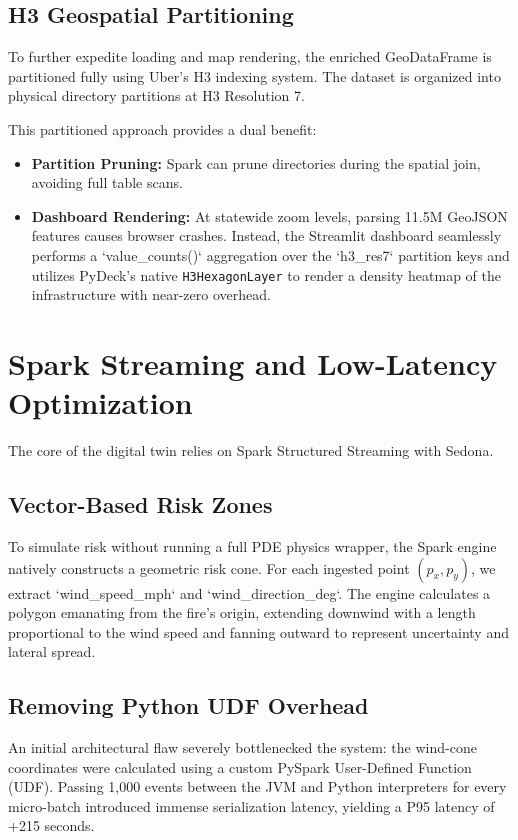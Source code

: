 \documentclass[acmsmall,screen,nonacm]{acmart}
\begin{document}
\subsection{H3 Geospatial Partitioning}
To further expedite loading and map rendering, the enriched GeoDataFrame is partitioned fully using Uber's H3 indexing system. The dataset is organized into physical directory partitions at H3 Resolution 7.

This partitioned approach provides a dual benefit:
\begin{itemize}
    \item \textbf{Partition Pruning:} Spark can prune directories during the spatial join, avoiding full table scans.
    \item \textbf{Dashboard Rendering:} At statewide zoom levels, parsing 11.5M GeoJSON features causes browser crashes. Instead, the Streamlit dashboard seamlessly performs a `value\_counts()` aggregation over the `h3\_res7` partition keys and utilizes PyDeck's native \texttt{H3HexagonLayer} to render a density heatmap of the infrastructure with near-zero overhead.
\end{itemize}

\section{Spark Streaming and Low-Latency Optimization}
The core of the digital twin relies on Spark Structured Streaming with Sedona.

\subsection{Vector-Based Risk Zones}
To simulate risk without running a full PDE physics wrapper, the Spark engine natively constructs a geometric risk cone. For each ingested point $(p_x, p_y)$, we extract `wind_speed_mph` and `wind_direction_deg`. The engine calculates a polygon emanating from the fire's origin, extending downwind with a length proportional to the wind speed and fanning outward to represent uncertainty and lateral spread. 

\subsection{Removing Python UDF Overhead}
An initial architectural flaw severely bottlenecked the system: the wind-cone coordinates were calculated using a custom PySpark User-Defined Function (UDF). Passing 1,000 events between the JVM and Python interpreters for every micro-batch introduced immense serialization latency, yielding a P95 latency of +215 seconds.
\end{document}
